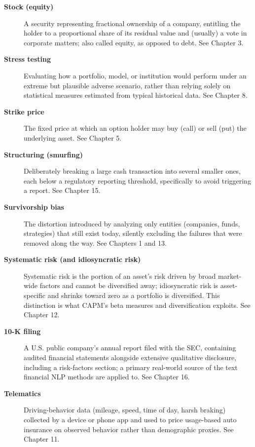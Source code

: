 \documentclass[../ai_in_finance]{subfiles}
\begin{document}
\begin{description}
\item[\textbf{Stock (equity)}] A security representing fractional ownership of a company, entitling the holder to a proportional share of its residual value and (usually) a vote in corporate matters; also called equity, as opposed to debt. See Chapter 3.

\item[\textbf{Stress testing}] Evaluating how a portfolio, model, or institution would perform under an extreme but plausible adverse scenario, rather than relying solely on statistical measures estimated from typical historical data. See Chapter 8.

\item[\textbf{Strike price}] The fixed price at which an option holder may buy (call) or sell (put) the underlying asset. See Chapter 5.

\item[\textbf{Structuring (smurfing)}] Deliberately breaking a large cash transaction into several smaller ones, each below a regulatory reporting threshold, specifically to avoid triggering a report. See Chapter 15.

\item[\textbf{Survivorship bias}] The distortion introduced by analyzing only entities (companies, funds, strategies) that still exist today, silently excluding the failures that were removed along the way. See Chapters 1 and 13.

\item[\textbf{Systematic risk (and idiosyncratic risk)}] Systematic risk is the portion of an asset's risk driven by broad market-wide factors and cannot be diversified away; idiosyncratic risk is asset-specific and shrinks toward zero as a portfolio is diversified. This distinction is what CAPM's beta measures and diversification exploits. See Chapter 12.

\item[\textbf{10-K filing}] A U.S. public company's annual report filed with the SEC, containing audited financial statements alongside extensive qualitative disclosure, including a risk-factors section; a primary real-world source of the text financial NLP methods are applied to. See Chapter 16.

\item[\textbf{Telematics}] Driving-behavior data (mileage, speed, time of day, harsh braking) collected by a device or phone app and used to price usage-based auto insurance on observed behavior rather than demographic proxies. See Chapter 11.


\end{description}
\end{document}
